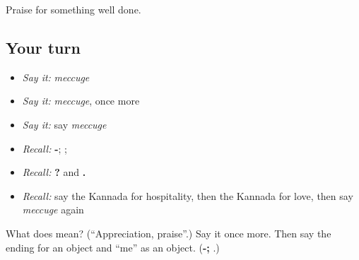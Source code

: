 \begin{grammarlens}[title={What you've built}]
Praise for something well done.
\end{grammarlens}

\subsection*{Your turn}
\begin{itemize}
\raggedright
  \item \emph{Say it:} \emph{meccuge}
  \item \emph{Say it:} \emph{meccuge}, once more
  \item \emph{Say it:} say \emph{meccuge}
  \item \emph{Recall:} \textbf{-}; \textbf{}; \textbf{}
  \item \emph{Recall:} \textbf{  ?} and \textbf{  .}
  \item \emph{Recall:} say the Kannada for hospitality, then the Kannada for love, then say \emph{meccuge} again
\end{itemize}

\begin{tcolorbox}[breakable,colback=teal!4,colframe=teal!35!black,title={Before you move on}]
What does  mean? (\textquotedblleft{}Appreciation, praise\textquotedblright{}.) Say it once more. Then say the ending for an object and “me” as an object. (\textbf{-; }.)
\end{tcolorbox}
